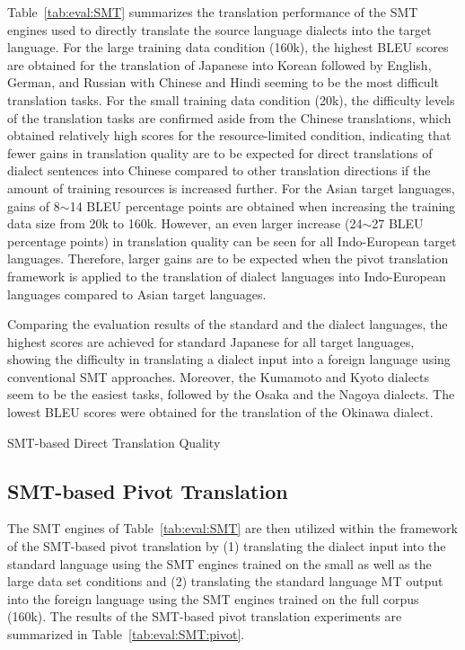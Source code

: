 \documentclass[english]{jnlp_1.4}
\begin{document}
 Table~\ref{tab:eval:SMT} summarizes the translation performance of the SMT engines used to directly translate the
 source language dialects into the target language. For the large training data condition (160k), the highest BLEU scores
 are obtained for the translation of Japanese into Korean followed by English, German, and Russian with Chinese and Hindi
 seeming to be the most difficult translation tasks.
 For the small training data condition (20k), the difficulty levels of the translation tasks are confirmed aside from
 the Chinese translations, which obtained relatively high scores for the resource-limited condition, indicating that
 fewer gains in translation quality are to be expected for direct translations of dialect sentences into Chinese
 compared to other translation directions if the amount of training resources is increased further.
 For the Asian target languages, gains of 8$\sim$14 BLEU percentage points are obtained when increasing the training data size from 20k to 160k.
 However, an even larger increase (24$\sim$27 BLEU percentage points) in translation quality can be seen for all Indo-European target languages.
 Therefore, larger gains are to be expected when the pivot translation framework is applied to the translation of dialect languages
 into Indo-European languages compared to Asian target languages.

 Comparing the evaluation results of the standard and the dialect languages, the highest scores are achieved
 for standard Japanese for all target languages, showing the difficulty in translating a dialect input
 into a foreign language using conventional SMT approaches. Moreover, the Kumamoto and Kyoto dialects seem to be the easiest tasks,
 followed by the Osaka and the Nagoya dialects. The lowest BLEU scores were obtained for the translation of the Okinawa dialect.

\begin{table}[t]
  \caption{SMT-based Direct Translation Quality}
  \label{tab:eval:SMT}

\end{table}


\subsection{SMT-based Pivot Translation}
\label{sec:experiments:pivot:smt}

 The SMT engines of Table~\ref{tab:eval:SMT} are then utilized within the framework of the SMT-based pivot translation
 by (1) translating the dialect input into the standard language using the SMT engines trained on the small as well as the
 large data set conditions and (2) translating the standard language MT output into the foreign language using the SMT engines
 trained on the full corpus (160k).
 The results of the SMT-based pivot translation experiments are summarized in Table~\ref{tab:eval:SMT:pivot}.
\end{document}

